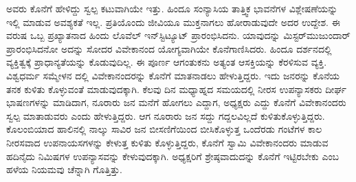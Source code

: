 ಅವರು ಕೊನೆಗೆ ಹೇಳಿದ್ದು ಸ್ವಲ್ಪ ಕಟುವಾಗಿಯೇ ಇತ್ತು. ಹಿಂದೂ ಸಂನ್ಯಾಸಿಯ ತಾತ್ತ್ವಿಕ ಭಾವನೆಗಳ ವಿಶ್ಲೇಷಣೆಯನ್ನು ಇಲ್ಲಿ ಮಾಡುವ ಅವಶ್ಯಕತೆ ಇಲ್ಲ. ಪ್ರತಿಯೊಂದು ಜೀವಿಯೂ ಮುಕ್ತನಾಗಲು ಹೋರಾಡುವುದೇ ಅದರ ಉದ್ದೇಶ. ಈ ವರುಷ ಒಬ್ಬ ಪ್ರಖ್ಯಾತನಾದ ಹಿಂದು ಲೊವೆಲ್​ ಇನ್​ಸ್ಟಿಟ್ಯೂಟ್​ ಪ್ರಾರಂಭಿಸಿದನು. ಯಾವುದನ್ನು ಮಿಸ್ಟರ್​ ಮುಜುಂದಾರ್​ ಪ್ರಾರಂಭಿಸಿದನೋ ಅದನ್ನು ಸೋದರ ವಿವೇಕಾನಂದ ಯೋಗ್ಯವಾಗಿಯೇ ಕೊನೆಗಾಣಿಸಿದರು. ಹಿಂದೂ ದರ್ಶನದಲ್ಲಿ ವ್ಯಕ್ತಿತ್ವಕ್ಕೆ ಪ್ರಾಧಾನ್ಯತೆಯನ್ನು ಕೊಡುವುದಿಲ್ಲ. ಈ ಪೂರ್ಣ ಆಗಂತುಕನು ಅತ್ಯಂತ ಆಸಕ್ತಿಯನ್ನು ಕೆರಳಿಸುವ ವ್ಯಕ್ತಿ. ವಿಶ್ವಧರ್ಮ ಸಮ್ಮೇಳನ ದಲ್ಲಿ ವಿವೇಕಾನಂದರನ್ನು ಕೊನೆಗೆ ಮಾತನಾಡಲು ಹೇಳುತ್ತಿದ್ದರು. ಇದು ಜನರನ್ನು ಕೊನೆಯ ತನಕ ಕುಳಿತು ಕೊಳ್ಳುವಂತೆ ಮಾಡುವುದಕ್ಕಾಗಿ. ಕೆಲವು ದಿನ ಮಧ್ಯಾಹ್ನದ ಸಮಯದಲ್ಲಿ ನೀರಸ ಉಪನ್ಯಾಸಕರು ದೀರ್ಘ ಭಾಷಣಗಳನ್ನು ಮಾಡಿದಾಗ, ನೂರಾರು ಜನ ಮನೆಗೆ ಹೋಗಲು ಎದ್ದಾಗ, ಅಧ್ಯಕ್ಷರು ಎದ್ದು ಕೊನೆಗೆ ವಿವೇಕಾನಂದರು ಸ್ವಲ್ಪ ಮಾತಾಡುವರು ಎಂದು ಹೇಳುತ್ತಿದ್ದರು. ಆಗ ನೂರಾರು ಜನ ಸದ್ದು ಗದ್ದಲವಿಲ್ಲದೆ ಕುಳಿತುಕೊಳ್ಳುತ್ತಿದ್ದರು. ಕೊಲಂಬಿಯಾದ ಹಾಲಿನಲ್ಲಿ ನಾಲ್ಕು ಸಾವಿರ ಜನ ಬೀಸಣಿಗೆಯಿಂದ ಬೀಸಿಕೊಳ್ಳುತ್ತ ಒಂದೆರಡು ಗಂಟೆಗಳ ಕಾಲ ನೀರಸವಾದ ಉಪನಾಯಸಗಳನ್ನು ಕೇಳುತ್ತ ಕುಳಿತು ಕೊಳ್ಳುತ್ತಿದ್ದರು, ಕೊನೆಗೆ ಸ್ವಾಮಿ ವಿವೇಕಾನಂದರು ಮಾಡುವ ಹದಿನೈದು ನಿಮಿಷಗಳ ಉಪನ್ಯಾಸವನ್ನು ಕೇಳುವುದಕ್ಕಾಗಿ. ಅಧ್ಯಕ್ಷರಿಗೆ ಶ್ರೇಷ್ಠವಾದುದನ್ನು ಕೊನೆಗೆ ಇಟ್ಟಿರಬೇಕು ಎಂಬ ಹಳೆಯ ನಿಯಮವು ಚೆನ್ನಾಗಿ ಗೊತ್ತಿತ್ತು.

